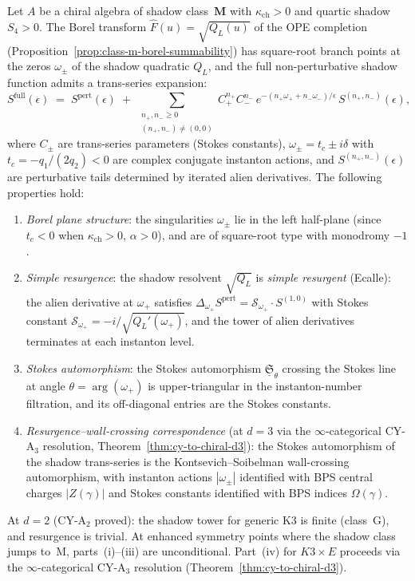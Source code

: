 \begin{conjecture}
\label{conj:shadow-resurgence}
\ClaimStatusConjectured
Let $A$ be a chiral algebra of shadow class~$\mathbf{M}$ with $\kappa_{\mathrm{ch}} > 0$ and quartic shadow $S_4 > 0$. The Borel transform $\hat{F}(u) = \sqrt{Q_L(u)}$ of the OPE completion \textup{(}Proposition~\textup{\ref{prop:class-m-borel-summability})} has square-root branch points at the zeros $\omega_\pm$ of the shadow quadratic $Q_L$, and the full non-perturbative shadow function admits a trans-series expansion:
\begin{equation}
\label{eq:shadow-trans-series}
 S^{\mathrm{full}}(\epsilon) \;=\; S^{\mathrm{pert}}(\epsilon) \;+\; \sum_{\substack{n_+, n_- \geq 0 \\ (n_+, n_-) \neq (0,0)}} C_+^{n_+} C_-^{n_-}\, e^{-(n_+ \omega_+ + n_- \omega_-)/\epsilon}\, S^{(n_+, n_-)}(\epsilon),
\end{equation}
where $C_\pm$ are trans-series parameters \textup{(}Stokes constants\textup{)}, $\omega_\pm = t_c \pm i\delta$ with $t_c = -q_1/(2q_2) < 0$ are complex conjugate instanton actions, and $S^{(n_+, n_-)}(\epsilon)$ are perturbative tails determined by iterated alien derivatives. The following properties hold:
\begin{enumerate}[label=\textup{(\roman*)}]
 \item \emph{Borel plane structure}: the singularities $\omega_\pm$ lie in the left half-plane \textup{(}since $t_c < 0$ when $\kappa_{\mathrm{ch}} > 0$, $\alpha > 0$\textup{)}, and are of square-root type with monodromy $-1$.
 \item \emph{Simple resurgence}: the shadow resolvent $\sqrt{Q_L}$ is \emph{simple resurgent} \textup{(}Ecalle\textup{)}: the alien derivative at $\omega_+$ satisfies $\Delta_{\omega_+} S^{\mathrm{pert}} = \mathcal{S}_{\omega_+} \cdot S^{(1,0)}$ with Stokes constant $\mathcal{S}_{\omega_+} = -i/\sqrt{Q_L'(\omega_+)}$, and the tower of alien derivatives terminates at each instanton level.
 \item \emph{Stokes automorphism}: the Stokes automorphism $\underline{\mathfrak{S}}_\theta$ crossing the Stokes line at angle $\theta = \arg(\omega_+)$ is upper-triangular in the instanton-number filtration, and its off-diagonal entries are the Stokes constants.
 \item \emph{Resurgence--wall-crossing correspondence} \textup{(}at $d = 3$ via the $\infty$-categorical CY-A$_3$ resolution, Theorem~\textup{\ref{thm:cy-to-chiral-d3}}\textup{)}: the Stokes automorphism of the shadow trans-series is the Kontsevich--Soibelman wall-crossing automorphism, with instanton actions $|\omega_\pm|$ identified with BPS central charges $|Z(\gamma)|$ and Stokes constants identified with BPS indices $\Omega(\gamma)$.
\end{enumerate}
At $d = 2$ \textup{(}CY-A$_2$ proved\textup{)}: the shadow tower for generic K3 is finite \textup{(}class~G\textup{)}, and resurgence is trivial. At enhanced symmetry points where the shadow class jumps to~M, parts~\textup{(i)--(iii)} are unconditional. Part~\textup{(iv)} for $K3 \times E$ proceeds via the $\infty$-categorical CY-A$_3$ resolution \textup{(}Theorem~\textup{\ref{thm:cy-to-chiral-d3}}\textup{)}.


\end{conjecture}

